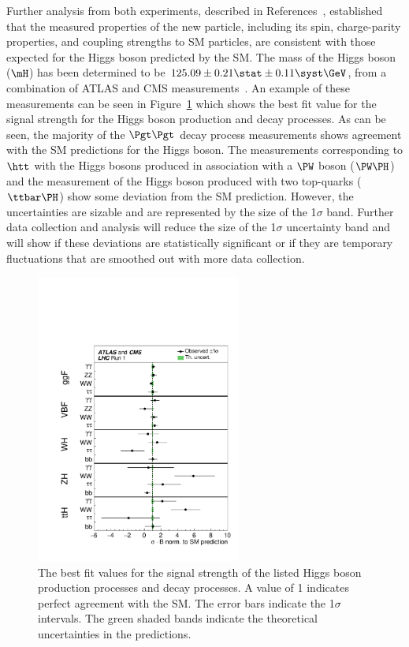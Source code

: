 Further analysis from both experiments, described in References~\cite{Aad:2015gba, Khachatryan:2014jba, 
Chatrchyan:2012jja, Aad:2013xqa, Khachatryan:2014kca,Sirunyan:2017exp},
established that the measured properties of the new particle,
including its spin, charge-parity properties, and coupling strengths to SM particles, 
are consistent with those expected for the Higgs boson predicted by the SM.
The mass of the Higgs boson ($\mH$) has been determined to be
$125.09\pm0.21\stat\pm0.11\syst\GeV$, from a combination of
ATLAS and CMS measurements~\cite{Aad:2015zhl}. An example of these measurements
can be seen in Figure~\ref{fig:run_1_comb_mu} which shows the best fit value for the signal
strength for the Higgs boson production and decay processes. As can be seen, the
majority of the $\Pgt\Pgt$ decay process measurements shows agreement with the SM predictions for the Higgs
boson. The measurements corresponding to $\htt$ with the Higgs bosons produced in association
with a $\PW$ boson ($\PW\PH$) and the measurement of the Higgs boson produced with
two top-quarks ($\ttbar\PH$) show some deviation from the SM prediction. However, 
the uncertainties are sizable and are represented by the size of the 1$\sigma$ band. Further data collection and analysis
will reduce the size of the 1$\sigma$ uncertainty band and will show if 
these deviations are statistically significant or if they are 
temporary fluctuations that are smoothed out with more data collection.

\begin{figure}[htbp]
\centering
     \includegraphics[width=0.6\textwidth]{introduction/plots/run_1_comb_mu.pdf}
     \caption{
The best fit values for the signal strength of the listed Higgs boson production
processes and decay processes. A value of 1 indicates perfect agreement with the SM.
The error bars indicate the 1$\sigma$ intervals. The green shaded bands indicate the
theoretical uncertainties in the predictions.
     }
     \label{fig:run_1_comb_mu}
\end{figure}

